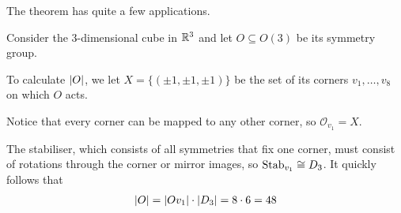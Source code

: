 The theorem has quite a few applications.
\begin{ex}[]
  Consider the $3$-dimensional cube in $\mathbb{R}^{3}$ and let $O \subseteq O(3)$ be its symmetry group.

  To calculate $\vert O\vert$, we let $X = \{(\pm 1, \pm 1, \pm 1)\}$ be the set of its corners $v_{1}, \ldots, v_{8}$ on which $O$ acts.

  Notice that every corner can be mapped to any other corner, so $\mathcal{O}_{v_1} = X$.

  The stabiliser, which consists of all symmetries that fix one corner, must consist of rotations through the corner or mirror images, so $\operatorname{Stab}_{v_1} \cong D_3$.
  It quickly follows that
  \begin{align*}
    \vert O\vert = \vert Ov_1\vert \cdot \vert D_3\vert = 8 \cdot 6 = 48
  \end{align*}
\end{ex}

